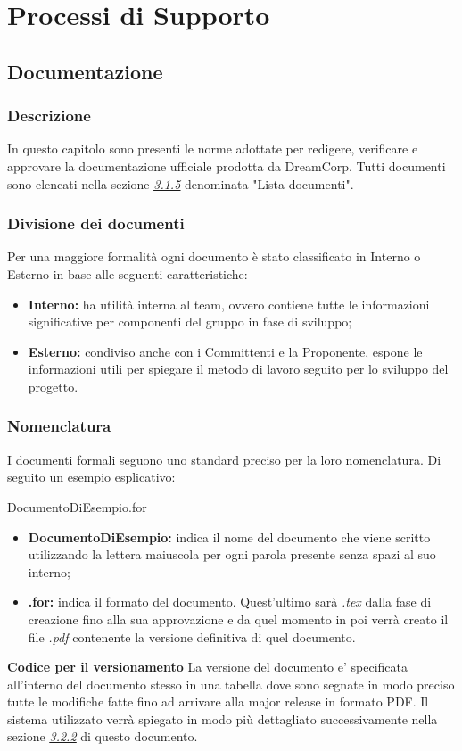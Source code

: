 \section{Processi di Supporto}

	\subsection{Documentazione}
		\subsubsection{Descrizione}
			In questo capitolo sono presenti le norme adottate per 	redigere, verificare e approvare la documentazione 			ufficiale prodotta da DreamCorp. Tutti documenti sono 		elencati nella sezione \hyperref[3.1.5]{\textit{\underline{3.1.5}}} denominata "Lista documenti".
		\subsubsection{Divisione dei documenti}
			Per una maggiore formalità ogni documento è stato classificato in Interno o Esterno in base alle seguenti caratteristiche:
			\begin{itemize}
				\item \textbf{Interno:} ha utilità interna al team, ovvero contiene tutte le informazioni significative per componenti del gruppo in fase di sviluppo;
				\item \textbf{Esterno:} condiviso anche con i Committenti e la Proponente, espone le informazioni utili per spiegare il metodo di lavoro seguito per lo sviluppo del progetto.
			\end{itemize}
		\subsubsection{Nomenclatura}
			I documenti formali seguono uno standard preciso per la loro nomenclatura. Di seguito un esempio esplicativo: 					\newline 
			\begin{center}
				DocumentoDiEsempio.for
			\end{center}
			\begin{itemize}
				\item \textbf{DocumentoDiEsempio:} indica il nome del documento che viene scritto utilizzando la lettera maiuscola per ogni parola presente senza spazi al suo interno;
				\item \textbf{.for:} indica il formato del documento. Quest'ultimo sarà \textit{.tex} dalla fase di creazione fino alla sua approvazione e da quel momento in poi verrà creato il file \textit{.pdf} contenente la versione definitiva di quel documento.
			\end{itemize}
			\textbf{Codice per il versionamento} La versione del documento e' specificata all'interno del documento stesso in una tabella dove sono segnate in modo preciso tutte le modifiche fatte fino ad arrivare alla major release in formato PDF. Il sistema utilizzato verrà spiegato in modo più dettagliato successivamente nella sezione \hyperref[3.2.2]{\textit{\underline{3.2.2}}} di questo documento.

